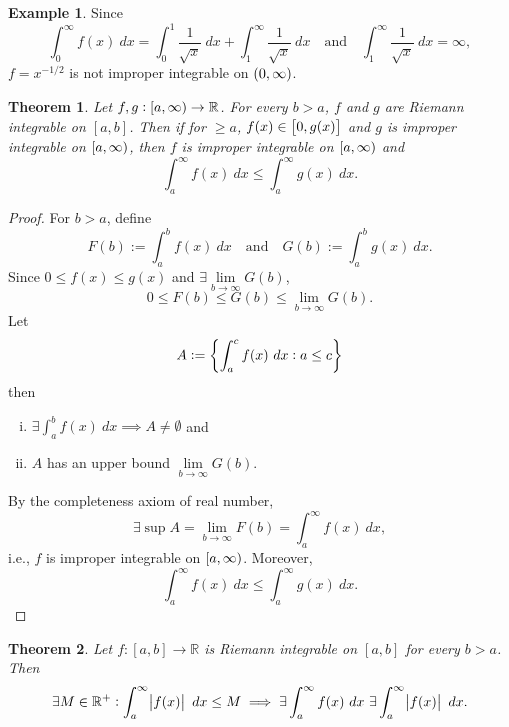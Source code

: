 \documentclass[12pt,openany]{book}
\newtheorem{theorem}{Theorem}[chapter]
\theoremstyle{definition}
\newtheorem{example}{Example}[chapter]
\newcommand{\R}{\mathbb{R}}
\newcommand{\ie}{\textnormal{i.e.}}
\begin{document}
	\vspace{10pt}
	\begin{example}
		Since \[
		\int_0^\infty f(x)\ dx=\int_0^1\frac{1}{\sqrt{x}}\ dx +\int_1^{\infty}\frac{1}{\sqrt{x}}\ dx\quad\text{and}\quad\int_1^{\infty}\frac{1}{\sqrt{x}}\ dx = \infty,
		\] $f=x^{-1/2}$ is not improper integrable on $\intoo{0,\infty}$.
	\end{example}
	\vspace{20pt}
	\newpage
	\begin{tcolorbox}[colframe=thmcolor, title={\color{white}\bf Comparison Test}]
		\begin{theorem}
			Let $f,g:\intco{a,\infty}\to\R$. For every $b>a$, $f$ and $g$ are Riemann integrable on $[a,b]$. Then if for $\geq a$, $f(x)\in\intcc{0,g(x)}$ and $g$ is improper integrable on $\intco{a,\infty}$, then $f$ is improper integrable on $\intco{a,\infty}$ and \[
			\int_a^{\infty}f(x)\ dx\leq\int_a^{\infty}g(x)\ dx.
			\]
		\end{theorem}
	\end{tcolorbox}
	\begin{proof}
		For $b>a$, define \[
		F(b):=\int_a^bf(x)\ dx\quad\text{and}\quad G(b):=\int_a^bg(x)\ dx.
		\] Since $0\leq f(x)\leq g(x)$ and $\exists\lim\limits_{b\to \infty}G(b)$, \[
		0\leq F(b)\leq G(b)\leq\lim\limits_{b\to\infty} G(b).
		\] Let \[
		A:=\set{\int_a^c f(x)
		\ dx:a\leq c}
		\] then \begin{enumerate}[(i)]
			\item $\exists\int_a^bf(x)\ dx\implies A\neq\emptyset$ and
			\item $A$ has an upper bound $\lim\limits_{b\to\infty}G(b)$.
		\end{enumerate} By the completeness axiom of real number, \[
		\exists\sup A=\lim\limits_{b\to\infty} F(b)=\int_a^\infty f(x)\ dx,
		\] \ie, $f$ is improper integrable on $\intco{a,\infty}$. Moreover, \[
		\int_a^\infty f(x)\ dx \leq\int_a^\infty g(x)\ dx.
		\]
	\end{proof}
	\vspace{10pt}
	\begin{tcolorbox}[colframe=thmcolor, title={\color{white}\bf }]
		\begin{theorem}
			Let $f:[a,b]\to\R$ is Riemann integrable on $[a,b]$ for every $b>a$. Then \[
			\exists M\in\R^+:\int_a^\infty\abs{f(x)}\ dx\leq M\implies\exists\int_a^\infty f(x)\ dx\ \exists\int_a^\infty \abs{f(x)}\ dx.
			\]
		\end{theorem}
	\end{tcolorbox}
\end{document}
